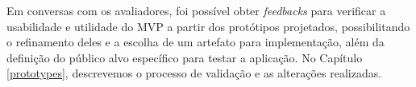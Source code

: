 Em conversas com os avaliadores, foi possível obter \textit{feedbacks} para verificar a usabilidade e utilidade do MVP a partir dos protótipos projetados, possibilitando o refinamento deles e a escolha de um artefato para implementação, além da definição do público alvo específico para testar a aplicação. No Capítulo \ref{prototypes}, descrevemos o processo de validação e as alterações realizadas. 






